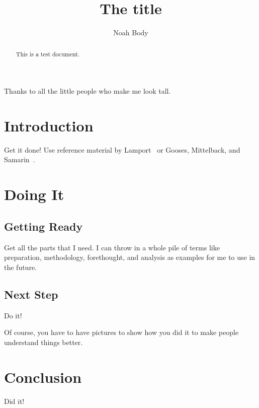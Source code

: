 \documentclass[12pt,glossary]{dalcsthesis}
\begin{document}
\mcs  %
\title{The title}
\author{Noah Body}



\nolistoftables
\nolistoffigures

\frontmatter

\begin{abstract}
This is a test document.
\end{abstract}

\printglossary

\begin{acknowledgements}
Thanks to all the little people who make me look tall.
\end{acknowledgements}

\mainmatter

\chapter{Introduction}

Get it done!  Use reference material by Lamport~\cite{latex-by-lamport} or
Gooses, Mittelback, and Samarin~\cite{latex-companion}.

\chapter{Doing It}

\section{Getting Ready}

Get all the parts that I need.  I can throw in a whole pile of terms like
preparation,
methodology,
forethought,
and
analysis
as examples for me to use in the future.

\section{Next Step}

Do it!

Of course, you have to have pictures to show how you did it to make people
understand things better.

\chapter{Conclusion}

Did it!



\end{document}
